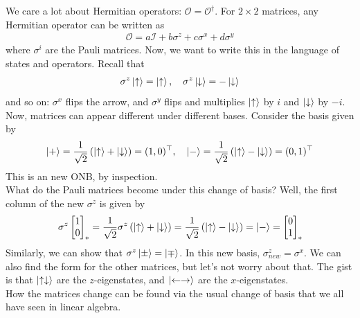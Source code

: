 \documentclass{book}
\theoremstyle{definition}
\newcommand{\f}[2]{\frac{#1}{#2}}
\newcommand{\lp}{\left(}
\newcommand{\rp}{\right)}
\newcommand{\Id}{\mathcal{I}}
\begin{document}
We care a lot about Hermitian operators: $\mathcal{O} = \mathcal{O}^\dagger$. For $2\times 2$ matrices, any Hermitian operator can be written as 
\begin{align}
\mathcal{O} = a\Id + b\sigma^z + c\sigma^x + d\sigma^y
\end{align}
where $\sigma^i$ are the Pauli matrices. Now, we want to write this in the language of states and operators. Recall that 
\begin{align}
\sigma^z\ket{\uparrow} = \ket{\uparrow}, \quad \sigma^z\ket{\downarrow} = -\ket{\downarrow}
\end{align}
and so on: $\sigma^x$ flips the arrow, and $\sigma^y$ flips and multiplies $\ket{\uparrow}$ by $i$ and $\ket{\downarrow}$ by $-i$. \\

Now, matrices can appear different under different bases. Consider the basis given by
\begin{align}
\ket{+} = \f{1}{\sqrt{2}}\lp \ket{\uparrow} + \ket{\downarrow} \rp = (1,0)^\top, \quad
\ket{-} = \f{1}{\sqrt{2}}\lp \ket{\uparrow} - \ket{\downarrow} \rp = (0,1)^\top
\end{align}
This is an new ONB, by inspection. \\
 
What do the Pauli matrices become under this change of basis? Well, the first column of the new $\sigma^z$ is given by
\begin{align}
\sigma^z\begin{bmatrix}
1\\0
\end{bmatrix}_* = \f{1}{\sqrt{2}} \sigma^z \lp \ket{\uparrow} +  \ket{\downarrow} \rp = \f{1}{\sqrt{2}}\lp \ket{\uparrow} - \ket{\downarrow} \rp  =\ket{-} = \begin{bmatrix}
0\\1
\end{bmatrix}_*
\end{align}
Similarly, we can show that $\sigma^z\ket{\pm} = \ket{\mp}$. In this new basis, $\sigma^z_{new} = \sigma^x$. We can also find the form for the other matrices, but let's not worry about that. The gist is that $\ket{\uparrow\downarrow}$ are the $z$-eigenstates, and $\ket{\leftarrow\rightarrow}$ are the $x$-eigenstates. \\

How the matrices change can be found via the usual change of basis that we all have seen in linear algebra.\\
\end{document}
